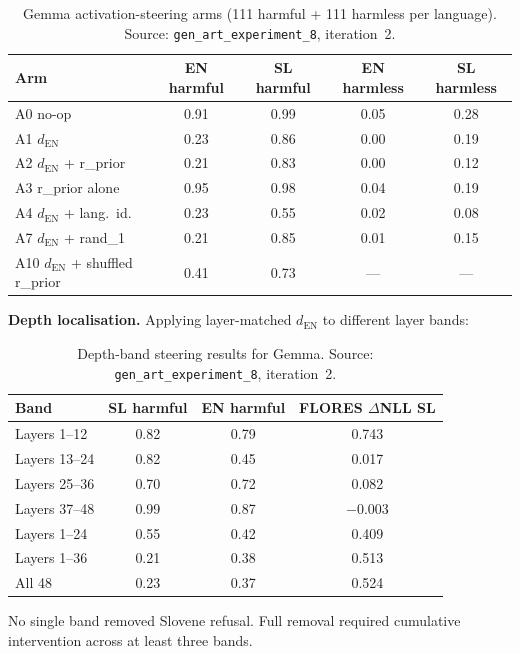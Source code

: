 \documentclass[11pt,letterpaper]{article}
\begin{document}
\begin{table}[!htbp]
\centering
\caption{Gemma activation-steering arms (111 harmful + 111 harmless per language). Source: \texttt{gen\_art\_experiment\_8}, iteration~2.}
\label{tab:exp8_arms}
\small
\begin{tabular}{lcccc}
\toprule
Arm & EN harmful & SL harmful & EN harmless & SL harmless \\
\midrule
A0 no-op & 0.91 & 0.99 & 0.05 & 0.28 \\
A1 $d_\mathrm{EN}$ & 0.23 & 0.86 & 0.00 & 0.19 \\
A2 $d_\mathrm{EN}$ + r\_prior & 0.21 & 0.83 & 0.00 & 0.12 \\
A3 r\_prior alone & 0.95 & 0.98 & 0.04 & 0.19 \\
A4 $d_\mathrm{EN}$ + lang.\ id. & 0.23 & 0.55 & 0.02 & 0.08 \\
A7 $d_\mathrm{EN}$ + rand\_1 & 0.21 & 0.85 & 0.01 & 0.15 \\
A10 $d_\mathrm{EN}$ + shuffled r\_prior & 0.41 & 0.73 & --- & --- \\
\bottomrule
\end{tabular}
\end{table}

\textbf{Depth localisation.} Applying layer-matched $d_\mathrm{EN}$ to different layer bands:

\begin{table}[!htbp]
\centering
\caption{Depth-band steering results for Gemma. Source: \texttt{gen\_art\_experiment\_8}, iteration~2.}
\label{tab:exp8_depth}
\small
\begin{tabular}{lccc}
\toprule
Band & SL harmful & EN harmful & FLORES $\Delta$NLL SL \\
\midrule
Layers 1--12 & 0.82 & 0.79 & 0.743 \\
Layers 13--24 & 0.82 & 0.45 & 0.017 \\
Layers 25--36 & 0.70 & 0.72 & 0.082 \\
Layers 37--48 & 0.99 & 0.87 & $-$0.003 \\
Layers 1--24 & 0.55 & 0.42 & 0.409 \\
Layers 1--36 & 0.21 & 0.38 & 0.513 \\
All 48 & 0.23 & 0.37 & 0.524 \\
\bottomrule
\end{tabular}
\end{table}

No single band removed Slovene refusal. Full removal required cumulative intervention across at least three bands.
\end{document}
